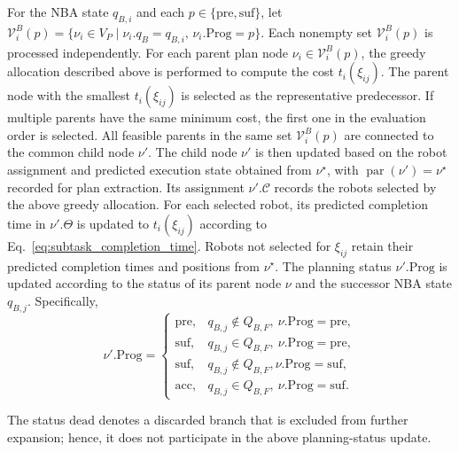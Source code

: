 \documentclass[lettersize,journal]{IEEEtran}
\theoremstyle{italiclemma}
\theoremstyle{italiclemma}
\theoremstyle{definition}
\begin{document}
For the NBA state $q_{B,i}$ and each $p\in\{\mathrm{pre},\mathrm{suf}\}$, let $\mathcal V_i^B(p)=\{\nu_i\in V_P\mid
\nu_i.q_B=q_{B,i},\,\nu_i.\mathrm{Prog}=p\}$. Each nonempty set $\mathcal V_i^B(p)$ is processed independently.  For each parent plan node $\nu_i\in\mathcal V_i^B(p)$, the greedy allocation described above is performed to compute the  cost $t_i(\xi_{ij})$. The  parent node with the smallest $t_i(\xi_{ij})$ is selected as the representative predecessor. If multiple parents have the same minimum cost, the first one in the evaluation order is selected. All feasible parents in the same set $\mathcal V_i^B(p)$ are connected to the common child node $\nu'$.
The child node $\nu'$ is then updated based on the robot assignment and predicted execution state obtained from $\nu^\star$, with $\operatorname{par}(\nu')=\nu^\star$ recorded for plan extraction.  Its assignment $\nu'.\mathcal C$ records the robots selected by the above greedy allocation. For each selected robot, its predicted completion time in $\nu'.\Theta$ is updated to $t_i(\xi_{ij})$ according to Eq.~\eqref{eq:subtask_completion_time}.
Robots not selected for $\xi_{ij}$ retain their predicted completion times and positions from $\nu^\star$. 
The planning status $\nu'.\mathrm{Prog}$ is updated according to the status of its parent node $\nu$ and the successor NBA state $q_{B,j}$. Specifically,
\begin{equation}
\label{eq:planning_status_update}
\nu'.\mathrm{Prog}
=
\begin{cases}
\mathrm{pre},
& q_{B,j}\notin Q_{B,F},\ \nu.\mathrm{Prog}=\mathrm{pre},\\
\mathrm{suf},
& q_{B,j}\in Q_{B,F},\ \nu.\mathrm{Prog}=\mathrm{pre},\\
\mathrm{suf},
& q_{B,j}\notin Q_{B,F},\nu. \mathrm{Prog}=\mathrm{suf},\\
\mathrm{acc},
& q_{B,j}\in Q_{B,F},\ \nu.\mathrm{Prog}=\mathrm{suf}.
\end{cases}
\end{equation}

The status $\mathrm{dead}$ denotes a discarded branch that is excluded from further expansion; hence, it does not participate in the above planning-status update.







\end{document}
